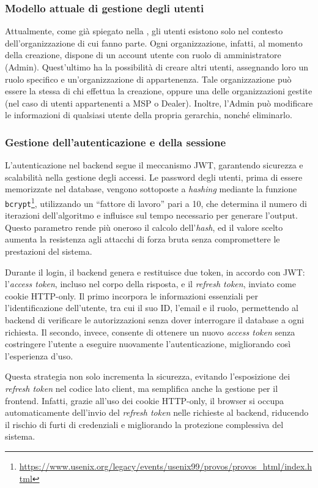 \subsubsection{Modello attuale di gestione degli utenti}
Attualmente, come già spiegato nella , gli utenti esistono solo nel contesto dell'organizzazione di cui fanno parte. Ogni organizzazione, infatti, al momento della creazione, dispone di un account utente con ruolo di amministratore (Admin). Quest'ultimo ha la possibilità di creare altri utenti, assegnando loro un ruolo specifico e un'organizzazione di appartenenza. Tale organizzazione può essere la stessa di chi effettua la creazione, oppure una delle organizzazioni gestite (nel caso di utenti appartenenti a MSP o Dealer). Inoltre, l'Admin può modificare le informazioni di qualsiasi utente della propria gerarchia, nonché eliminarlo.

\subsubsection{Gestione dell'autenticazione e della sessione}
L'autenticazione nel backend segue il meccanismo JWT, garantendo sicurezza e scalabilità nella gestione degli accessi. Le password degli utenti, prima di essere memorizzate nel database, vengono sottoposte a \textit{hashing} mediante la funzione \texttt{bcrypt}\footnote{\url{https://www.usenix.org/legacy/events/usenix99/provos/provos_html/index.html}}, utilizzando un ``fattore di lavoro'' pari a 10, che determina il numero di iterazioni dell'algoritmo e influisce sul tempo necessario per generare l'output. Questo parametro rende più oneroso il calcolo dell'\textit{hash}, ed il valore scelto aumenta la resistenza agli attacchi di forza bruta senza compromettere le prestazioni del sistema.

Durante il login, il backend genera e restituisce due token, in accordo con JWT: l'\textit{access token}, incluso nel corpo della risposta, e il \textit{refresh token}, inviato come cookie HTTP-only. Il primo incorpora le informazioni essenziali per l'identificazione dell'utente, tra cui il suo ID, l'email e il ruolo, permettendo al backend di verificare le autorizzazioni senza dover interrogare il database a ogni richiesta. Il secondo, invece, consente di ottenere un nuovo \textit{access token} senza costringere l'utente a eseguire nuovamente l'autenticazione, migliorando così l'esperienza d'uso.

Questa strategia non solo incrementa la sicurezza, evitando l’esposizione dei \textit{refresh token} nel codice lato client, ma semplifica anche la gestione per il frontend. Infatti, grazie all'uso dei cookie HTTP-only, il browser si occupa automaticamente dell'invio del \textit{refresh token} nelle richieste al backend, riducendo il rischio di furti di credenziali e migliorando la protezione complessiva del sistema.

